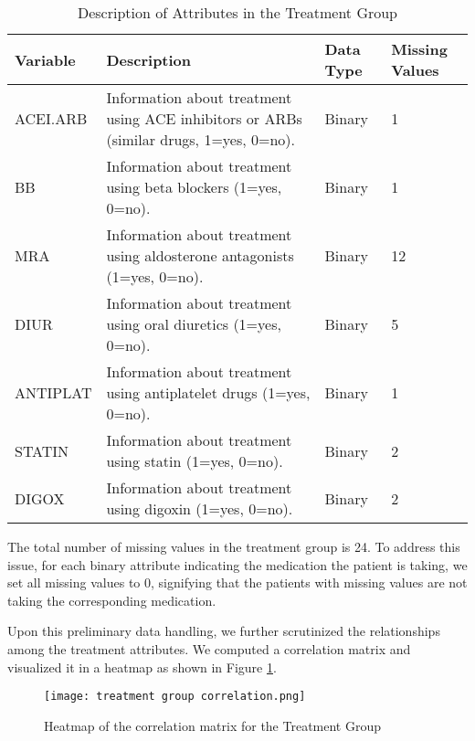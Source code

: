         \begin{table}[H]
          \centering
          \caption{Description of Attributes in the Treatment Group}
          \label{tab:treatment group attributes}
          \begin{adjustbox}{center}
          \begin{tabular}{|p{2cm}|p{10cm}|p{1.8cm}|p{1.8cm}|}
          \hline
          \textbf{Variable} & \textbf{Description} & \textbf{Data Type} & \textbf{Missing Values} \\ \hline
          ACEI.ARB & Information about treatment using ACE inhibitors or ARBs (similar drugs, 1=yes, 0=no). & Binary & 1 \\
          BB & Information about treatment using beta blockers (1=yes, 0=no). & Binary & 1\\
          MRA & Information about treatment using aldosterone antagonists (1=yes, 0=no). & Binary & 12 \\
          DIUR & Information about treatment using oral diuretics (1=yes, 0=no). & Binary & 5 \\
          ANTIPLAT & Information about treatment using antiplatelet drugs (1=yes, 0=no). & Binary & 1 \\
          STATIN & Information about treatment using statin (1=yes, 0=no). & Binary & 2 \\
          DIGOX & Information about treatment using digoxin (1=yes, 0=no). & Binary & 2 \\ \hline
          \end{tabular}
          \end{adjustbox}
        \end{table}

        The total number of missing values in the treatment group is 24. To address this issue, for each binary attribute indicating the medication the patient is taking, we set all missing values to 0, signifying that the patients with missing values are not taking the corresponding medication.

        Upon this preliminary data handling, we further scrutinized the relationships among the treatment attributes. We computed a correlation matrix and visualized it in a heatmap as shown in Figure \ref{fig:treatment group heatmap}.

        \begin{figure}[H]
          \texttt{[image: treatment group correlation.png]}
          \caption{Heatmap of the correlation matrix for the Treatment Group}
          \label{fig:treatment group heatmap}
        \end{figure}
      
